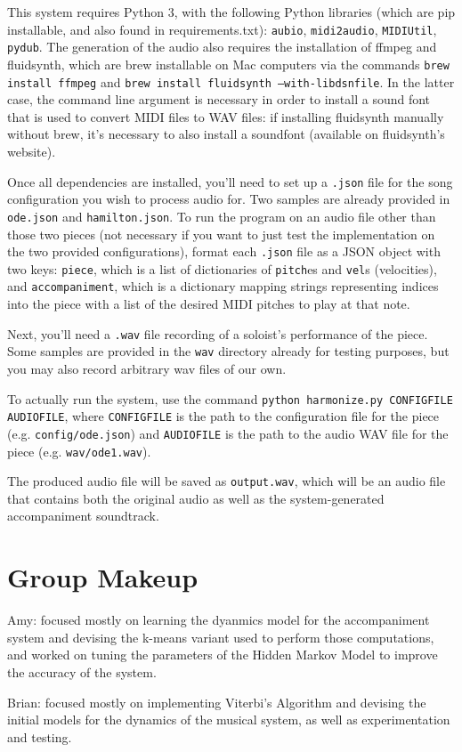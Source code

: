 \documentclass[11pt]{article}
\begin{document}
This system requires Python 3, with the following Python libraries (which are pip installable, and also found in requirements.txt): \texttt{aubio}, \texttt{midi2audio}, \texttt{MIDIUtil}, \texttt{pydub}. The generation of the audio also requires the installation of ffmpeg and fluidsynth, which are brew installable on Mac computers via the commands \texttt{brew install ffmpeg} and \texttt{brew install fluidsynth --with-libdsnfile}. In the latter case, the command line argument is necessary in order to install a sound font that is used to convert MIDI files to WAV files: if installing fluidsynth manually without brew, it's necessary to also install a soundfont (available on fluidsynth's website).

Once all dependencies are installed, you'll need to set up a \texttt{.json} file
for the song configuration you wish to process audio for. Two samples are already provided in
\texttt{ode.json} and \texttt{hamilton.json}. To run the program on an audio file other
than those two pieces (not necessary if you want to just test the implementation
on the two provided configurations),
format each \texttt{.json} file as a JSON object with two keys:
\texttt{piece}, which is a list of dictionaries of \texttt{pitch}es and \texttt{vel}s
(velocities), and \texttt{accompaniment}, which is a dictionary mapping strings
representing indices into the piece with a list of the desired MIDI pitches to play
at that note.

Next, you'll need a \texttt{.wav} file recording of a soloist's performance of the piece.
Some samples are provided in the \texttt{wav} directory already for testing purposes,
but you may also record arbitrary wav files of our own.

To actually run the system, use the command
\texttt{python harmonize.py CONFIGFILE AUDIOFILE}, where
\texttt{CONFIGFILE} is the path to the configuration file for the piece
(e.g. \texttt{config/ode.json})
and \texttt{AUDIOFILE} is the path to the audio WAV file for the piece
(e.g. \texttt{wav/ode1.wav}).

The produced audio file will be saved as \texttt{output.wav}, which will
be an audio file that contains both the original audio as well as the system-generated
accompaniment soundtrack.

\section{Group Makeup}

Amy: focused mostly on learning the dyanmics model for the accompaniment
system and devising the k-means variant used to perform those computations,
and worked on tuning the parameters of the Hidden Markov Model to improve
the accuracy of the system.

Brian: focused mostly on implementing Viterbi's Algorithm and devising
the initial models for the dynamics of the musical system, as well as
experimentation and testing.



\end{document}
